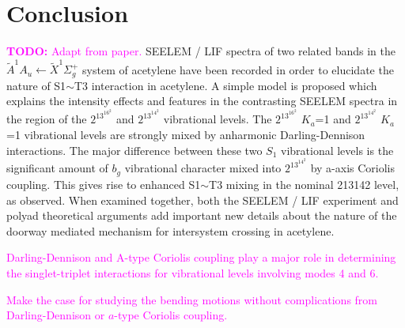 \documentclass[12pt,draft]{mitthesis}
\newcommand{\TODO} [1]{\textcolor{magenta}{\textbf{TODO:} #1}}
\newcommand{\POINT}[1]{\textcolor{magenta}{#1}}
\begin{document}








\section{Conclusion}

\TODO{Adapt from paper.}  SEELEM / LIF spectra of two related bands in
the $\tilde{A}^1A_u \leftarrow \tilde{X} ^1\Sigma_g^+$ system of
acetylene have been recorded in order to elucidate the nature of
S1$\sim$T3 interaction in acetylene. A simple model is proposed which
explains the intensity effects and features in the contrasting SEELEM
spectra in the region of the $2^13^16^2$ and $2^13^14^2$ vibrational
levels. The $2^13^16^2$ $K_a$=1 and $2^13^14^2$ $K_a$=1 vibrational
levels are strongly mixed by anharmonic Darling-Dennison
interactions. The major difference between these two $S_1$ vibrational
levels is the significant amount of $b_g$ vibrational character mixed
into $2^13^14^2$ by a-axis Coriolis coupling. This gives rise to
enhanced S1$\sim$T3 mixing in the nominal 213142 level, as observed.
When examined together, both the SEELEM / LIF experiment and polyad
theoretical arguments add important new details about the nature of
the doorway mediated mechanism for intersystem crossing in acetylene.

\POINT{Darling-Dennison and A-type Coriolis coupling play a major role
  in determining the singlet-triplet interactions for vibrational
  levels involving modes 4 and 6.}

\POINT{Make the case for studying the bending motions without
  complications from Darling-Dennison or $a$-type Coriolis coupling.}





\end{document}
